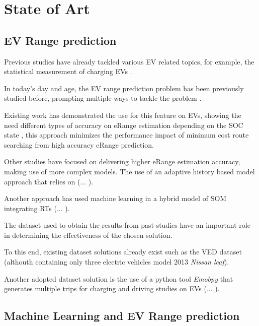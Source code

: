 \chapter{State of Art}
\label{cha:stateOfArt}

\section{EV Range prediction}

Previous studies have already tackled 
various \gls{EV} related topics, for example, 
the statistical measurement of charging \gls{EV}s
\citep{EVScout2}.

In today's day and age, the \gls{EV} range prediction 
problem has been previously studied before,
prompting multiple ways to tackle the problem \citep{predictionOfeRange}.

Existing work has demonstrated the use for 
this feature on \gls{EV}s, showing the need
different types of accuracy on \gls{eRange}
estimation depending on the \gls{SOC} state \citep{eRange},
this approach minimizes the performance impact
of minimum cost route searching from high accuracy
\gls{eRange} prediction.

Other studies have focused on delivering 
higher \gls{eRange} estimation accuracy,
making use of more complex models. 
The use of an adaptive history based model 
approach \citep{classicEVX} that relies on
(... ).

Another approach has used machine learning in a hybrid model
of \gls{SOM} integrating \gls{RTs} \citep{hybridMachineLearningERange}
 (... ).

The \gls{dataset} used to obtain the results
from past studies have an important role
in determining the effectiveness of the chosen 
solution.

To this end, existing \gls{dataset} solutions
already exist such as the VED \gls{dataset} \citep{vedDataset}
(althouth containing only three electric vehicles
\- model 2013 \textit{Nissan leaf}).

Another adopted \gls{dataset} solution is the use of 
a \gls{python} tool \textit{Emobpy} \citep{emobpy}
that generates multiple trips for charging and driving
studies on \gls{EVs}  (... ).

\section{Machine Learning and EV Range prediction}





